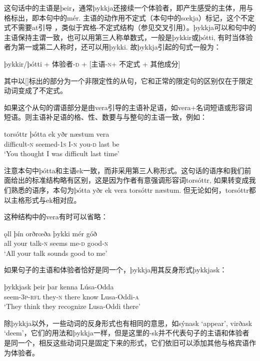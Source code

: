 这句话中的主语是þeir，通常þykkja还接续一个体验者，即产生感受的主体，用与格标出，即本句中的mér. 主语的动作用不定式（本句中的sœkja）标记，这个不定式不需要at引导 ，类似于宾格-不定式结构（参见交叉引用）。þykkja可以和句中的主语保持主谓一致，也可以用第三人称单数式，一般是þykkir或þótti, 有时当体验者为第一或第二人称时，还可以用þykki. 故þykkja引起的句式一般为：
\begin{info}
    þykkir/þótti + 体验者-\textsc{d} + [主语-\textsc{n}\footnotemark + 不定式 + 其他成分]
\end{info}
其中以[]标出的部分为一个非限定性的从句，它和正常的限定句的区别仅在于限定动词变成了不定式。

如果这个从句的谓语部分是由vera引导的主语补足语，如vera+名词短语或形容词短语。则主语补足语的格、性、数要与与整句的主语一致，例如：
\begin{exe}
    \ex
    \gll torsóttr	þótta	ek	yðr	næstum	vera\\
    difficult-\textsc{n}	seemed-{\footnotesize 1}\textsc{s}	I-\textsc{n}	you-\textsc{d}	last	be\\
    \trans `You thought I was difficult last time’

\end{exe}

注意本句中þótta和主语ek一致，而非采用第三人称形式。这句话的语序和我们前面给出的标准结构略有区别，这是因为作者有意强调形容词torsóttr, 如果转变成我们熟悉的语序，本句为þótta yðr ek vera torsóttr næstum. 但无论如何，torsóttr都以主格形式与ek相对应。

这种结构中的vera有时可以省略：
\begin{exe}
    \ex
    \gll ǫll	þín	orðrœða	þykki	mér	góð\\
    all	your	talk-\textsc{n}	seems	me-\textsc{d}	good-\textsc{n}\\
    \trans `All your talk sounds good to me’
\end{exe}

如果句子的主语和体验者恰好是同一个，þykkja用其反身形式þykkjask：
\begin{exe}
    \ex
    \gll þykkjask	þeir	þar	kenna	Lúsa-Odda\\
    seem-{\footnotesize 3}\textsc{p}-\textsc{rfl}	they-\textsc{n}	there	know	Lusa-Oddi-\textsc{a}\\
    \trans `They think they recognize Lusa-Oddi there’
\end{exe}

除þykkja以外，一些动词的反身形式也有相同的意思，如sýnask `appear’, virðask `deem’，它们的用法和þykkja一样，但是这里的-sk并不代表句子的主语和体验者是同一个，相反这些动词只是固定下来的形式，它们依旧可以添加其他与格宾语作为体验者。

